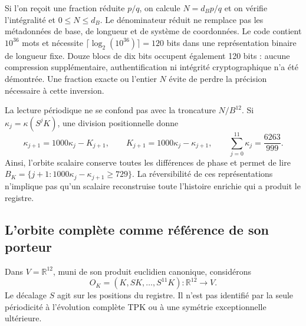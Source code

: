 Si l’on reçoit une fraction réduite \(p/q\), on calcule
\(N=d_Bp/q\) et on vérifie l’intégralité et \(0\leq N\leq d_B\).
Le dénominateur réduit ne remplace pas les métadonnées de base, de longueur et de
système de coordonnées. Le code contient \(10^{36}\) mots et nécessite
\(\lceil\log_2(10^{36})\rceil=120\) bits dans une représentation binaire
de longueur fixe. Douze blocs de dix bits occupent également 120 bits : aucune
compression supplémentaire, authentification ni intégrité
cryptographique n’a été démontrée. Une fraction exacte ou l’entier \(N\) évite de perdre la
précision nécessaire à cette inversion.

La lecture périodique ne se confond pas avec la troncature \(N/B^{12}\). Si \(\kappa_j=\kappa(S^jK)\), une division positionnelle donne
\begin{equation}
 \kappa_{j+1}=1000\kappa_j-K_{j+1},\qquad
 K_{j+1}=1000\kappa_j-\kappa_{j+1},\qquad
 \sum_{j=0}^{11}\kappa_j=\frac{6263}{999}.
 \label{lib01:orbita-kappa}
\end{equation}
Ainsi, l’orbite scalaire conserve toutes les différences de phase et permet
de lire \(B_K=\{j+1:1000\kappa_j-\kappa_{j+1}\geq729\}\).
La réversibilité de ces représentations n’implique pas qu’un scalaire
reconstruise toute l’histoire enrichie qui a produit le registre.

\subsection{L’orbite complète comme référence de son porteur}
\label{lib01:orbita}

Dans \(V=\mathbb R^{12}\), muni de son produit euclidien canonique, considérons
\[
 O_K=(K,SK,\ldots,S^{11}K):\mathbb R^{12}\longrightarrow V.
\]
Le décalage \(S\) agit sur les positions du registre. Il n’est pas
identifié par la seule périodicité à l’évolution complète TPK ou à
une symétrie exceptionnelle ultérieure.

